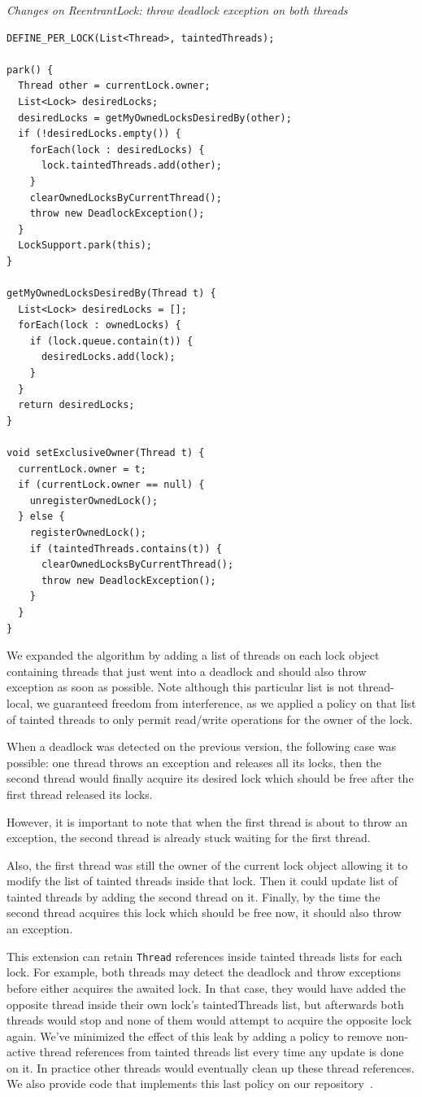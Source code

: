 \medskip
\noindent
{\it Changes on ReentrantLock: throw deadlock exception on both threads}
\begin{verbatim}
DEFINE_PER_LOCK(List<Thread>, taintedThreads);

park() {
  Thread other = currentLock.owner;
  List<Lock> desiredLocks;
  desiredLocks = getMyOwnedLocksDesiredBy(other);
  if (!desiredLocks.empty()) {
    forEach(lock : desiredLocks) {
      lock.taintedThreads.add(other);
    }
    clearOwnedLocksByCurrentThread();
    throw new DeadlockException();
  }
  LockSupport.park(this);
}

getMyOwnedLocksDesiredBy(Thread t) {
  List<Lock> desiredLocks = [];
  forEach(lock : ownedLocks) {
    if (lock.queue.contain(t)) {
      desiredLocks.add(lock);
    }
  }
  return desiredLocks;
}

void setExclusiveOwner(Thread t) {
  currentLock.owner = t;
  if (currentLock.owner == null) {
    unregisterOwnedLock();
  } else {
    registerOwnedLock();
    if (taintedThreads.contains(t)) {
      clearOwnedLocksByCurrentThread();
      throw new DeadlockException();
    }
  }
}

\end{verbatim}

We expanded the algorithm by adding a list of threads on each lock object containing threads that just went into a deadlock and should also throw exception as soon as possible.
Note although this particular list is not thread-local, we guaranteed freedom from interference,
as we applied a policy on that list of tainted threads to only permit read/write operations for the owner of the lock.

When a deadlock was detected on the previous version, the following case was possible:
one thread throws an exception and releases all its locks,
then the second thread would finally acquire its desired lock
which should be free after the first thread released its locks.

However, it is important to note that when the first thread is about to throw an exception,
the second thread is already stuck waiting for the first thread.

Also, the first thread was still the owner of the current lock object allowing it to modify the list of tainted threads inside that lock.
Then it could update list of tainted threads by adding the second thread on it.
Finally, by the time the second thread acquires this lock which should be free now, it should also throw an exception.

This extension can retain {\tt Thread} references inside tainted threads lists for each lock.
For example, both threads may detect the deadlock and throw exceptions before either acquires the awaited lock.
In that case, they would have added the opposite thread inside their own lock's taintedThreads list, but afterwards
both threads would stop and none of them would attempt to acquire the opposite lock again.
We've minimized the effect of this leak by adding a policy to remove non-active thread
references from tainted threads list every time any update is done on it.
In practice other threads would eventually clean up these thread references.
We also provide code that implements this last policy on our repository~\cite{repo}.
